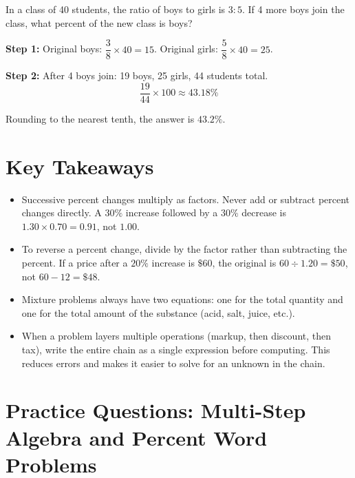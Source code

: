 \documentclass[14pt]{extarticle}
\begin{document}
In a class of 40 students, the ratio of boys to girls is \(3:5\). If 4 more boys join the class, what percent of the new class is boys?

\textbf{Step 1:} Original boys: \(\dfrac{3}{8} \times 40 = 15\). Original girls: \(\dfrac{5}{8} \times 40 = 25\).

\textbf{Step 2:} After 4 boys join: 19 boys, 25 girls, 44 students total.
\[
\frac{19}{44} \times 100 \approx 43.18\%
\]

Rounding to the nearest tenth, the answer is \(\boxed{43.2}\%\).

\section*{Key Takeaways}
\begin{itemize}
  \item Successive percent changes multiply as factors. Never add or subtract percent changes directly. A \(30\%\) increase followed by a \(30\%\) decrease is \(1.30 \times 0.70 = 0.91\), not \(1.00\).
  \item To reverse a percent change, divide by the factor rather than subtracting the percent. If a price after a \(20\%\) increase is \(\$60\), the original is \(60 \div 1.20 = \$50\), not \(60 - 12 = \$48\).
  \item Mixture problems always have two equations: one for the total quantity and one for the total amount of the substance (acid, salt, juice, etc.).
  \item When a problem layers multiple operations (markup, then discount, then tax), write the entire chain as a single expression before computing. This reduces errors and makes it easier to solve for an unknown in the chain.
\end{itemize}

\newpage

\section*{Practice Questions: Multi-Step Algebra and Percent Word Problems}
\end{document}

